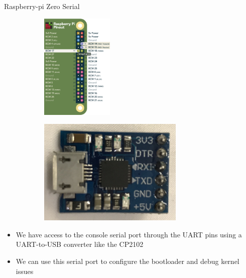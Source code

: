 \begin{frame}
   {Raspberry-pi Zero Serial}
   \begin{figure}[H]
      \centering
      \begin{subfigure}{0.4\textwidth}
         \centering
         \includegraphics[height=2in]{IMAGES/rpi-pins-uart}
      \end{subfigure}
      \begin{subfigure}{0.4\textwidth}
         \centering
         \includegraphics[height=2in]{IMAGES/CP2102}
      \end{subfigure}
   \end{figure}
   \begin{itemize}
      \item We have access to the console serial port through the UART pins using a UART-to-USB converter like the CP2102
      \item We can use this serial port to configure the bootloader and debug kernel issues
   \end{itemize}
\end{frame}

\cprotect{}

